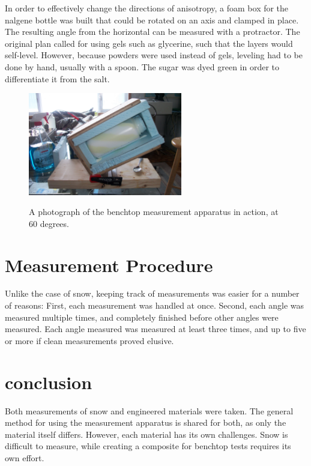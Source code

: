 In order to effectively change the directions of anisotropy, a foam box for the
nalgene bottle was built that could be rotated on an axis and clamped in place.
The resulting angle from the horizontal can be measured with a protractor. The
original plan called for using gels such as glycerine, such that the layers
would self-level. However, because powders were used instead of gels, leveling
had to be done by hand, usually with a spoon. The sugar was dyed green in order
 to differentiate it from the salt.

\begin{figure}[h]
\centering
\includegraphics[width=0.6\textwidth]{fig/tilter_irl.jpg}
\label{fig:tilter}
\caption{A photograph of the benchtop measurement apparatus in action, at 60 degrees.}
\end{figure}

\section{Measurement Procedure}

Unlike the case of snow, keeping track of measurements was easier for a number
of reasons: First, each measurement was handled at once. Second, each angle
was measured multiple times, and completely finished before other angles were
measured. Each angle measured was measured at least three times, and up to five
or more if clean measurements proved elusive.

\section{conclusion}

Both measurements of snow and engineered materials were taken. The general
method for using the measurement apparatus is shared for both, as only the
material itself differs. However, each material has its own challenges. Snow
is difficult to measure, while creating a composite for benchtop tests requires
its own effort.
